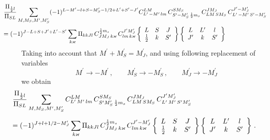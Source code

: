 \documentclass[a4paper,oneside,12pt]{extarticle}
\begin{document}
\begin{equation}
\hspace{-12mm}
\begin{array}{l} \displaystyle
\frac{\Pi_{\frac{1}{2} l}}{\Pi_{SL}} 
\sum_{M, M_S,M^{\prime}, M_S^{\prime}}
(-1)^{L-M^{\prime}-l+ S-M_S^{\prime}-1/2+L^{\prime}+S^{\prime}-J^{\prime}} 
C^{LM}_{L^{\prime} \, -M^{\prime} \, lm} \,
C^{S M_S}_{ S^{\prime} -M_S^{\prime}  \,\frac{1}{2} m_s } \,
C^{JM_J}_{LM \, S M_S} \,
C^{J^{\prime} -M_J^{\prime}}_{L^{\prime} \,-M^{\prime} \,
S^{\prime} -M_S^{\prime}} \,
%
\\[6mm] = \displaystyle
%
(-1)^{J-L+S+J^{\prime}+L^{\prime}-S^{\prime}}
\sum_{k \varkappa}
\Pi_{kkJl} \, C^{\frac{1}{2} m_s}_{J M_J \, k\varkappa} \,
C^{J^{\prime} M_J^{\prime}}_{lm \, k\varkappa}
\left \{
\begin{array}{ccc}
L & S & J \\
\frac{1}{2} & k & S^{\prime}
\end{array}
\right \}
\left \{
\begin{array}{ccc}
L & L^{\prime} & l \\
J^{\prime} & k & S^{\prime}
\end{array}
\right \}
%
\end{array}
\end{equation}
%
Taking into account that $M^{\prime}+M_S^{\prime}=M_J^{\prime}$, and using following replacement of variables
$$
M^{\prime} \to -M^{\prime} \,, \qquad M_S^{\prime} \to -M_S^{\prime} \,,
\qquad M_J^{\prime} \to -M_J^{\prime}
$$
we obtain
%
\begin{equation}
\hspace{-12mm}
\begin{array}{l} \displaystyle
\frac{\Pi_{\frac{1}{2} l}}{\Pi_{SL}} 
\sum_{M, M_S,M^{\prime}, M_S^{\prime}}
C^{LM}_{L^{\prime} \, M^{\prime} \, lm} \,
C^{S M_S}_{ S^{\prime} M_S^{\prime}  \,\frac{1}{2} m_s } \,
C^{JM_J}_{LM \, S M_S} \,
C^{J^{\prime} M_J^{\prime}}_{L^{\prime} \,M^{\prime} \,
S^{\prime} M_S^{\prime}} \,
%
\\[7mm] = \displaystyle
%
(-1)^{J+l+1/2-M_J^{\prime}}
\sum_{k \varkappa}
\Pi_{kkJl} \, C^{\frac{1}{2} m_s}_{J M_J \, k\varkappa} \,
C^{J^{\prime} -M_J^{\prime}}_{lm \, k\varkappa}
\left \{
\begin{array}{ccc}
L & S & J \\
\frac{1}{2} & k & S^{\prime}
\end{array}
\right \}
\left \{
\begin{array}{ccc}
L & L^{\prime} & l \\
J^{\prime} & k & S^{\prime}
\end{array}
\right \} \,.
%
\end{array}
\end{equation}
\end{document}
